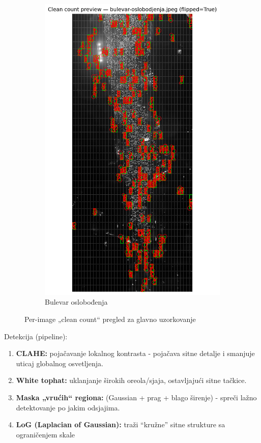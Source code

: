 \documentclass[a4paper,12pt]{article}
\begin{document}
\begin{figure}[H]
\begin{subfigure}[b]{0.3\textwidth}
	  \includegraphics[width=\textwidth]{../outputs/sampling_outputs/previews_images_main/bulevar-oslobodjenja_pilot_clean_count_preview.png}
	  \caption{Bulevar oslobođenja}
	  \label{fig:bulevar-oslobodjenja}
	\end{subfigure}
  
	\caption{Per-image „clean count“ pregled za glavno uzorkovanje}
\end{figure}


\noindent
Detekcija (pipeline):
\begin{enumerate}
  \item \textbf{CLAHE:} pojačavanje lokalnog kontrasta - pojačava sitne detalje i smanjuje uticaj globalnog osvetljenja.
  \item \textbf{White tophat:} uklanjanje širokih oreola/sjaja, ostavljajući sitne tačkice.
  \item \textbf{Maska „vrućih“ regiona:} (Gaussian + prag + blago širenje) - spreči lažno detektovanje po jakim odsjajima.
  \item \textbf{LoG (Laplacian of Gaussian):} traži “kružne” sitne strukture sa ograničenjem skale
\end{enumerate}
\end{document}
